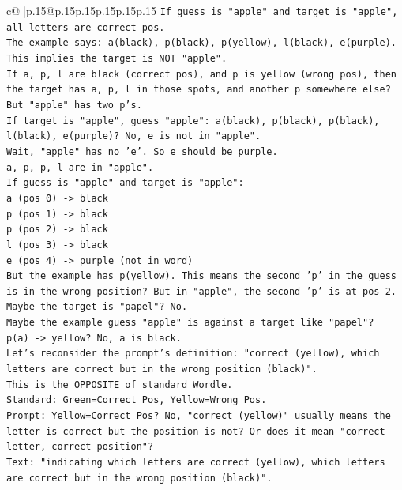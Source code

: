 \documentclass{article}
\begin{document}
{\begin{supertabular}{c@{$\;$}|p{.15\linewidth}@{}p{.15\linewidth}p{.15\linewidth}p{.15\linewidth}p{.15\linewidth}p{.15\linewidth}}
{{{\texttt{If guess is "apple" and target is "apple", all letters are correct pos.} \\
\texttt{The example says: a(black), p(black), p(yellow), l(black), e(purple).} \\
\texttt{This implies the target is NOT "apple".} \\
\texttt{If a, p, l are black (correct pos), and p is yellow (wrong pos), then the target has a, p, l in those spots, and another p somewhere else? But "apple" has two p's.} \\
\texttt{If target is "apple", guess "apple": a(black), p(black), p(black), l(black), e(purple)? No, e is not in "apple".} \\
\texttt{Wait, "apple" has no 'e'. So e should be purple.} \\
\texttt{a, p, p, l are in "apple".} \\
\texttt{If guess is "apple" and target is "apple":} \\
\texttt{a (pos 0) {-}> black} \\
\texttt{p (pos 1) {-}> black} \\
\texttt{p (pos 2) {-}> black} \\
\texttt{l (pos 3) {-}> black} \\
\texttt{e (pos 4) {-}> purple (not in word)} \\
\texttt{But the example has p(yellow). This means the second 'p' in the guess is in the wrong position? But in "apple", the second 'p' is at pos 2.} \\
\texttt{Maybe the target is "papel"? No.} \\
\texttt{Maybe the example guess "apple" is against a target like "papel"?} \\
\texttt{p(a) {-}> yellow? No, a is black.} \\
\texttt{Let's reconsider the prompt's definition: "correct (yellow), which letters are correct but in the wrong position (black)".} \\
\texttt{This is the OPPOSITE of standard Wordle.} \\
\texttt{Standard: Green=Correct Pos, Yellow=Wrong Pos.} \\
\texttt{Prompt: Yellow=Correct Pos? No, "correct (yellow)" usually means the letter is correct but the position is not? Or does it mean "correct letter, correct position"?} \\
\texttt{Text: "indicating which letters are correct (yellow), which letters are correct but in the wrong position (black)".} \\
}}}
\end{supertabular}}
\end{document}
